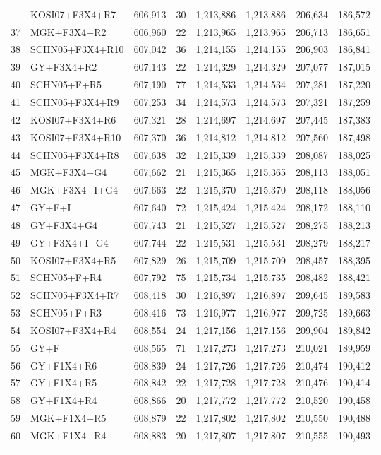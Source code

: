 \begin{longtable}{rlrrrrrr}
{36&KOSI07+F3X4+R7&606,913&30&1,213,886&1,213,886&206,634&186,572\\
37&MGK+F3X4+R2&606,960&22&1,213,965&1,213,965&206,713&186,651\\
38&SCHN05+F3X4+R10&607,042&36&1,214,155&1,214,155&206,903&186,841\\
39&GY+F3X4+R2&607,143&22&1,214,329&1,214,329&207,077&187,015\\
40&SCHN05+F+R5&607,190&77&1,214,533&1,214,534&207,281&187,220\\
41&SCHN05+F3X4+R9&607,253&34&1,214,573&1,214,573&207,321&187,259\\
42&KOSI07+F3X4+R6&607,321&28&1,214,697&1,214,697&207,445&187,383\\
43&KOSI07+F3X4+R10&607,370&36&1,214,812&1,214,812&207,560&187,498\\
44&SCHN05+F3X4+R8&607,638&32&1,215,339&1,215,339&208,087&188,025\\
45&MGK+F3X4+G4&607,662&21&1,215,365&1,215,365&208,113&188,051\\
46&MGK+F3X4+I+G4&607,663&22&1,215,370&1,215,370&208,118&188,056\\
47&GY+F+I&607,640&72&1,215,424&1,215,424&208,172&188,110\\
48&GY+F3X4+G4&607,743&21&1,215,527&1,215,527&208,275&188,213\\
49&GY+F3X4+I+G4&607,744&22&1,215,531&1,215,531&208,279&188,217\\
50&KOSI07+F3X4+R5&607,829&26&1,215,709&1,215,709&208,457&188,395\\
51&SCHN05+F+R4&607,792&75&1,215,734&1,215,735&208,482&188,421\\
52&SCHN05+F3X4+R7&608,418&30&1,216,897&1,216,897&209,645&189,583\\
53&SCHN05+F+R3&608,416&73&1,216,977&1,216,977&209,725&189,663\\
54&KOSI07+F3X4+R4&608,554&24&1,217,156&1,217,156&209,904&189,842\\
55&GY+F&608,565&71&1,217,273&1,217,273&210,021&189,959\\
56&GY+F1X4+R6&608,839&24&1,217,726&1,217,726&210,474&190,412\\
57&GY+F1X4+R5&608,842&22&1,217,728&1,217,728&210,476&190,414\\
58&GY+F1X4+R4&608,866&20&1,217,772&1,217,772&210,520&190,458\\
59&MGK+F1X4+R5&608,879&22&1,217,802&1,217,802&210,550&190,488\\
60&MGK+F1X4+R4&608,883&20&1,217,807&1,217,807&210,555&190,493\\
}
\end{longtable}
